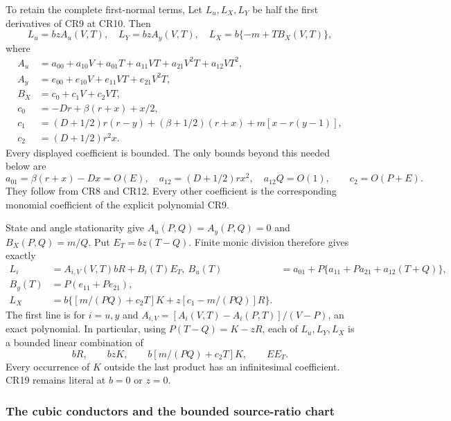To retain the complete first-normal terms, Let $L_u,L_X,L_Y$
be half the first derivatives of CR9 at CR10. Then
\[
 L_u=bz A_u(V,T),\quad L_Y=bz A_y(V,T),\quad
 L_X=b\{-m+TB_X(V,T)\},
 \tag{CR16}
\]
where
\[
\begin{aligned}
 A_u&=a_{00}+a_{10}V+a_{01}T+a_{11}VT+a_{21}V^2T+a_{12}VT^2,\\
 A_y&=e_{00}+e_{10}V+e_{11}VT+e_{21}V^2T,\\
 B_X&=c_0+c_1V+c_2VT,\\
 c_0&=-Dr+\beta(r+x)+x/2,\\
 c_1&=(D+1/2)r(r-y)+(\beta+1/2)(r+x)
                        +m[x-r(y-1)],\\
 c_2&=(D+1/2)r^2x.
\end{aligned}\tag{CR17}
\]
Every displayed coefficient is bounded. The only bounds beyond this
needed below are
\[
 a_{01}=\beta(r+x)-Dx=O(E),\quad
 a_{12}=(D+1/2)rx^2,\quad a_{12}Q=O(1),
 \qquad c_2=O(P+E).
 \tag{CR18}
\]
They follow from CR8 and CR12. Every other coefficient is the corresponding monomial coefficient
of the explicit polynomial CR9.

State and angle stationarity give
$A_u(P,Q)=A_y(P,Q)=0$ and $B_X(P,Q)=m/Q$.
Put $E_T=bz(T-Q)$. Finite monic division therefore gives exactly
\[
\begin{aligned}
 L_i&=A_{i,V}(V,T)bR+B_i(T)E_T,\
 B_u(T)&=a_{01}+P\{a_{11}+Pa_{21}+a_{12}(T+Q)\},\\
 B_y(T)&=P(e_{11}+Pe_{21}),\\
 L_X&=b\{[m/(PQ)+c_2T]K+z[c_1-m/(PQ)]R\}.
\end{aligned}\tag{CR19}
\]
The first line is for $i=u,y$ and
$A_{i,V}=[A_i(V,T)-A_i(P,T)]/(V-P)$, an exact polynomial.
In particular, using $P(T-Q)=K-zR$, each of $L_u,L_Y,L_X$
is a bounded linear combination of
\[
 bR,\qquad bzK,\qquad b[m/(PQ)+c_2T]K,
 \qquad E E_T.
 \tag{CR20}
\]
Every occurrence of $K$ outside the last product has an
infinitesimal coefficient. CR19 remains literal at $b=0$ or $z=0$.

\subsubsection*{The cubic conductors and the bounded source-ratio chart}

